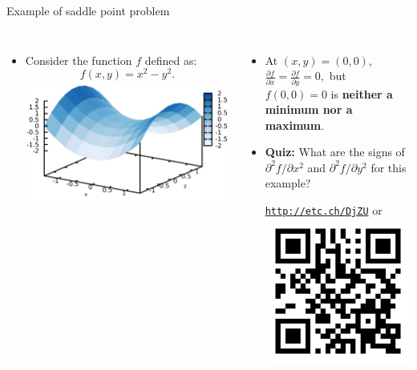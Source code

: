 	\begin{frame}{Example of saddle point problem}
	\begin{columns}[t]
	
	\begin{itemize}
	\item Consider the function $f$ defined as:
	\[
	f(x,y)=x^{2}-y^{2}.
	\]
	\includegraphics[width=0.8\columnwidth]{figures/numerical-methods-chemical-equilibrium/saddle-point-with-axis.png}
	\end{itemize}
	
	\pause
	\begin{itemize}
	\item At $(x,y)=(0,0)$,  
	$
	{\displaystyle \frac{\partial f}{\partial x}=\frac{\partial f}{\partial y}=0,}
	$ 
	but $f(0,0)=0$ is \textbf{neither a minimum nor a maximum}. 
	\pause
	\item \alert{\textbf{Quiz:}} What are the signs of $\partial^{2}f/\partial x^{2}$ and $\partial^{2}f/\partial y^{2}$ 
	for this example?
	\begin{center}
		\href{http://etc.ch/DjZU}{\textcolor{indigo(dye)}{\tt http://etc.ch/DjZU}} \quad or \quad 
		\includegraphics[height=0.2\columnwidth]{figures/numerical-methods-chemical-equilibrium/polls.png}
	\end{center}
	\end{itemize}
	\end{columns}
	
	\end{frame}
%
